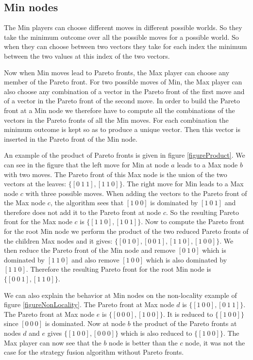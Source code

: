 \documentclass{ecai}
\begin{document}
\subsection{Min nodes}

The Min players can choose different moves in different possible
worlds. So they take the minimum outcome over all the possible moves
for a possible world. So when they can choose between two vectors they
take for each index the minimum between the two values at this index
of the two vectors.

Now when Min moves lead to Pareto fronts, the Max player can choose
any member of the Pareto front. For two possible moves of Min, the Max
player can also choose any combination of a vector in the Pareto front
of the first move and of a vector in the Pareto front of the second
move. In order to build the Pareto front at a Min node we therefore
have to compute all the combinations of the vectors in the Pareto
fronts of all the Min moves. For each combination the minimum outcome
is kept so as to produce a unique vector. Then this vector is inserted
in the Pareto front of the Min node.

An example of the product of Pareto fronts is given in
figure \ref{figureProduct}. We can see in the figure that the left
move for Min at node $a$ leads to a Max node $b$ with two moves. The
Pareto front of this Max node is the union of the two vectors at the
leaves: $\{[0~1~1],[1~1~0]\}$. The right move for Min leads to a Max
node $c$ with three possible moves. When adding the vectors to the
Pareto front of the Max node $c$, the algorithm sees that $[1~0~0]$ is
dominated by $[1~0~1]$ and therefore does not add it to the Pareto
front at node $c$. So the resulting Pareto front for the Max node $c$
is $\{[1~1~0],[1~0~1]\}$. Now to compute the Pareto front for the root
Min node we perform the product of the two reduced Pareto fronts of
the children Max nodes and it gives:
$\{[0~1~0],[0~0~1],[1~1~0],[1~0~0]\}$. We then reduce the Pareto front
of the Min node and remove $[0~1~0]$ which is dominated by $[1~1~0]$
and also remove $[1~0~0]$ which is also dominated by
$[1~1~0]$. Therefore the resulting Pareto front for the root Min node
is $\{[0~0~1],[1~1~0]\}$.

We can also explain the behavior at Min nodes on the non-locality
example of figure \ref{figureNonLocality}. The Pareto front at Max
node $d$ is $\{[1~0~0],[0~1~1]\}$. The Pareto front at Max node $e$ is
$\{[0~0~0],[1~0~0]\}$. It is reduced to $\{[1~0~0]\}$ since $[0~0~0]$
is dominated. Now at node $b$ the product of the Pareto fronts at
nodes $d$ and $e$ gives $\{[1~0~0],[0~0~0]\}$ which is also reduced to
$\{[1~0~0]\}$. The Max player can now see that the $b$ node is better
than the $c$ node, it was not the case for the strategy fusion
algorithm without Pareto fronts.
\end{document}
